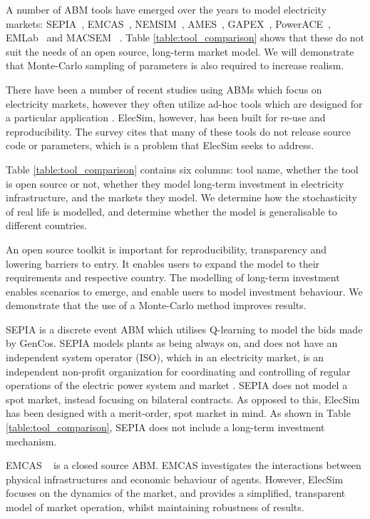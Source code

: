 A number of ABM tools have emerged over the years to model electricity markets: SEPIA~\cite{Harp2000}, EMCAS~\cite{Conzelmann}, NEMSIM~\cite{Batten2006}, AMES~\cite{Sun2007}, GAPEX~\cite{Cincotti2013}, PowerACE~\cite{Rothengatter2007}, EMLab~\cite{Chappin2017} and MACSEM ~\cite{Praca2003}. Table \ref{table:tool_comparison} shows that these do not suit the needs of an open source, long-term market model. We will demonstrate that Monte-Carlo sampling of parameters is also required to increase realism.

There have been a number of recent studies using ABMs which focus on electricity markets, however they often utilize ad-hoc tools which are designed for a particular application \cite{Saxena2019, hadar2019, Kunzel2018}. ElecSim, however, has been built for re-use and reproducibility. The survey \cite{Weidlich2008} cites that many of these tools do not release source code or parameters, which is a problem that ElecSim seeks to address.

Table \ref{table:tool_comparison} contains six columns: tool name, whether the tool is open source or not, whether they model long-term investment in electricity infrastructure, and the markets they model. We determine how the stochasticity of real life is modelled, and determine whether the model is generalisable to different countries. 


An open source toolkit is important for reproducibility, transparency and lowering barriers to entry. It enables users to expand the model to their requirements and respective country. The modelling of long-term investment enables scenarios to emerge, and enable users to model investment behaviour. We demonstrate that the use of a Monte-Carlo method improves results.

SEPIA \cite{Harp2000} is a discrete event ABM which utilises Q-learning to model the bids made by GenCos. SEPIA models plants as being always on, and does not have an independent system operator (ISO), which in an electricity market, is an independent non-profit organization for coordinating and controlling of regular operations of the electric power system and market \cite{Zhou2007}. SEPIA does not model a spot market, instead focusing on bilateral contracts. As opposed to this, ElecSim has been designed with a merit-order, spot market in mind. As shown in Table \ref{table:tool_comparison}, SEPIA does not include a long-term investment mechanism. 

EMCAS ~\cite{Conzelmann} is a closed source ABM. EMCAS investigates the interactions between physical infrastructures and economic behaviour of agents. However, ElecSim focuses on the dynamics of the market, and provides a simplified, transparent model of market operation, whilst maintaining robustness of results.

